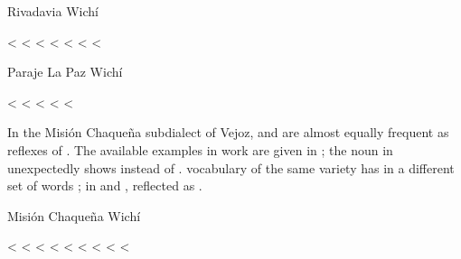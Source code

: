 \ea
Rivadavia Wichí \citep{JT09-th}\\
    \begin{xlist} 
        \ex {} <  \label{wi-riv-xx-tapir}
        \ex {} < 
        \ex {} < 
        \ex {} <  \label{wi-riv-xx-thing}
        \ex {} <  \label{wi-riv-xx-fox}
        \ex {} < 
        \ex {} <  \label{wi-riv-xx-seriema}
    \end{xlist}
\z
\ea
Paraje La Paz Wichí \citep{AFG067} \label{wi-plp-xx}\\
    \begin{xlist}
        \ex {} <  \label{wi-plp-xx-thing}
        \ex {} < 
        \ex {} <  \label{wi-plp-xx-tusca}
        \ex {} <  \label{wi-plp-xx-tapir}
        \ex {} <  \label{wi-plp-xx-horse}
    \end{xlist}
\z

In the Misión Chaqueña subdialect of Vejoz,  and  are almost equally frequent as reflexes of . The available examples in  work are given in ; the noun in  unexpectedly shows  instead of .  vocabulary of the same variety has  in a different set of words ; in  and ,  reflected as .

\ea
Misión Chaqueña Wichí \citep{VU74} \label{wi-vu-xx}\\
    \begin{xlist}
        \ex {} <  \label{wi-vu-xx-moon}
        \ex {} < 
        \ex {} < 
        \ex {} < 
        \ex {} <  \label{wi-vu-xx-rabbit}
        \ex {} < 
        \ex {} < 
        \ex {} < 
        \ex {} <  \label{wi-vu-xx-tusca}
    \end{xlist}
\z

